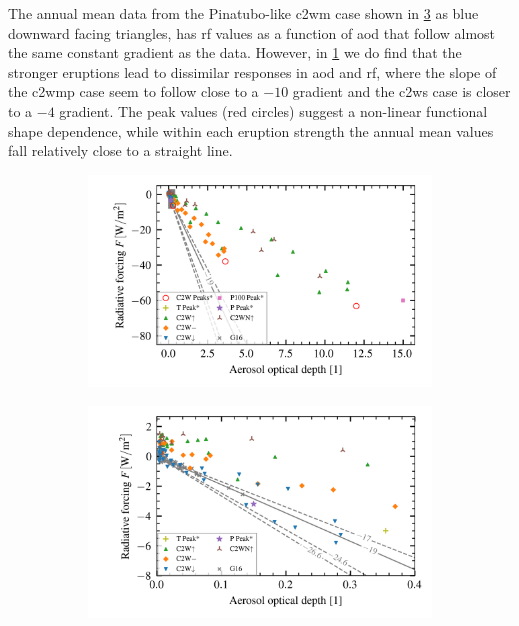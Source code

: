 \documentclass{ametsocV5}
\begin{document}
The annual mean data from the Pinatubo-like \ac{c2wm} case shown in
\cref{fig:aod_vs_toa_inset} as blue downward facing triangles, has \ac{rf} values as a
function of \ac{aod} that follow almost the same constant gradient as the
\citet{gregory2016} data. However, in \cref{fig:aod_vs_toa_full} we do find that the
stronger eruptions lead to dissimilar responses in \ac{aod} and \ac{rf}, where the slope
of the \ac{c2wmp} case seem to follow close to a \(-10\) gradient and the \ac{c2ws} case
is closer to a \(-4\) gradient. The peak values (red circles) suggest a non-linear
functional shape dependence, while within each eruption strength the annual mean values
fall relatively close to a straight line.

\begin{figure}
  \begin{subfigure}{\linewidth}
    \centering
    \includegraphics[width=0.95\linewidth]{figures/aod_vs_toa_avg_full.png}
    \caption{}%
    \label{fig:aod_vs_toa_full}
  \end{subfigure}
  \begin{subfigure}{\linewidth}
    \centering
    \includegraphics[width=0.95\linewidth]{figures/aod_vs_toa_avg_inset.png}
    \caption{}%
    \label{fig:aod_vs_toa_inset}
  \end{subfigure}


\end{figure}
\end{document}
